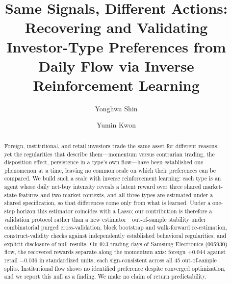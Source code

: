 \documentclass[sigconf,anonymous,review]{acmart}
\begin{document}
\title[Same Signals, Different Actions]{Same Signals, Different Actions:
  Recovering and Validating
  Investor-Type Preferences from Daily Flow via Inverse Reinforcement
  Learning}

\author{Yonghwa Shin}

\author{Yumin Kwon}

\begin{abstract}
Foreign, institutional, and retail investors trade the same asset for
different reasons, yet the regularities that describe them---momentum
versus contrarian trading, the disposition effect, persistence in a
type's own flow---have been established one phenomenon at a time,
leaving no common scale on which
their preferences can be compared. We build such a scale with inverse
reinforcement learning: each type is an agent whose daily net-buy
intensity reveals a latent reward over three shared market-state features
and two market contexts, and all three types are estimated under a
shared specification, so that differences come only from what is learned.
Under a one-step horizon this estimator coincides with a Lasso; our
contribution is therefore a validation protocol rather than a new
estimator---out-of-sample stability under combinatorial purged
cross-validation, block bootstrap and walk-forward re-estimation,
construct-validity checks against independently established behavioral
regularities, and explicit disclosure of null results. On 973 trading
days of Samsung Electronics (005930) flow, the recovered rewards separate
along the momentum axis: foreign $+0.044$ against retail $-0.036$ in
standardized units, each sign-consistent across all 45 out-of-sample
splits. Institutional flow shows no identified preference despite
converged optimization, and we report this null as a
finding. We make no claim of return predictability.
\end{abstract}
\end{document}
